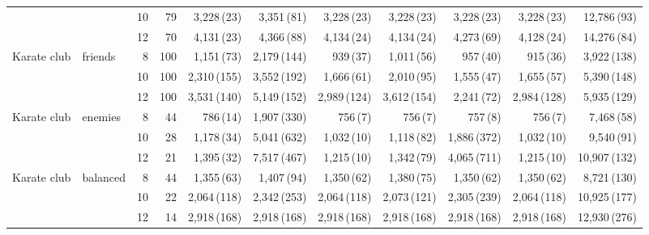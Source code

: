 \begin{table}[p]
{\begin{tabular}{llrrrrrrrrr}
 &  & 10 & 79 & 3,228\,{\scriptsize(23)} & 3,351\,{\scriptsize(81)} & 3,228\,{\scriptsize(23)} & 3,228\,{\scriptsize(23)} & 3,228\,{\scriptsize(23)} & 3,228\,{\scriptsize(23)} & 12,786\,{\scriptsize(93)} \\
 &  & 12 & 70 & 4,131\,{\scriptsize(23)} & 4,366\,{\scriptsize(88)} & 4,134\,{\scriptsize(24)} & 4,134\,{\scriptsize(24)} & 4,273\,{\scriptsize(69)} & 4,128\,{\scriptsize(24)} & 14,276\,{\scriptsize(84)} \\
\midrule
Karate club & friends & 8 & 100 & 1,151\,{\scriptsize(73)} & 2,179\,{\scriptsize(144)} & 939\,{\scriptsize(37)} & 1,011\,{\scriptsize(56)} & 957\,{\scriptsize(40)} & 915\,{\scriptsize(36)} & 3,922\,{\scriptsize(138)} \\
 &  & 10 & 100 & 2,310\,{\scriptsize(155)} & 3,552\,{\scriptsize(192)} & 1,666\,{\scriptsize(61)} & 2,010\,{\scriptsize(95)} & 1,555\,{\scriptsize(47)} & 1,655\,{\scriptsize(57)} & 5,390\,{\scriptsize(148)} \\
 &  & 12 & 100 & 3,531\,{\scriptsize(140)} & 5,149\,{\scriptsize(152)} & 2,989\,{\scriptsize(124)} & 3,612\,{\scriptsize(154)} & 2,241\,{\scriptsize(72)} & 2,984\,{\scriptsize(128)} & 5,935\,{\scriptsize(129)} \\
\addlinespace[1pt]
Karate club & enemies & 8 & 44 & 786\,{\scriptsize(14)} & 1,907\,{\scriptsize(330)} & 756\,{\scriptsize(7)} & 756\,{\scriptsize(7)} & 757\,{\scriptsize(8)} & 756\,{\scriptsize(7)} & 7,468\,{\scriptsize(58)} \\
 &  & 10 & 28 & 1,178\,{\scriptsize(34)} & 5,041\,{\scriptsize(632)} & 1,032\,{\scriptsize(10)} & 1,118\,{\scriptsize(82)} & 1,886\,{\scriptsize(372)} & 1,032\,{\scriptsize(10)} & 9,540\,{\scriptsize(91)} \\
 &  & 12 & 21 & 1,395\,{\scriptsize(32)} & 7,517\,{\scriptsize(467)} & 1,215\,{\scriptsize(10)} & 1,342\,{\scriptsize(79)} & 4,065\,{\scriptsize(711)} & 1,215\,{\scriptsize(10)} & 10,907\,{\scriptsize(132)} \\
\addlinespace[1pt]
Karate club & balanced & 8 & 44 & 1,355\,{\scriptsize(63)} & 1,407\,{\scriptsize(94)} & 1,350\,{\scriptsize(62)} & 1,380\,{\scriptsize(75)} & 1,350\,{\scriptsize(62)} & 1,350\,{\scriptsize(62)} & 8,721\,{\scriptsize(130)} \\
 &  & 10 & 22 & 2,064\,{\scriptsize(118)} & 2,342\,{\scriptsize(253)} & 2,064\,{\scriptsize(118)} & 2,073\,{\scriptsize(121)} & 2,305\,{\scriptsize(239)} & 2,064\,{\scriptsize(118)} & 10,925\,{\scriptsize(177)} \\
 &  & 12 & 14 & 2,918\,{\scriptsize(168)} & 2,918\,{\scriptsize(168)} & 2,918\,{\scriptsize(168)} & 2,918\,{\scriptsize(168)} & 2,918\,{\scriptsize(168)} & 2,918\,{\scriptsize(168)} & 12,930\,{\scriptsize(276)} \\

\end{tabular}}
\end{table}
